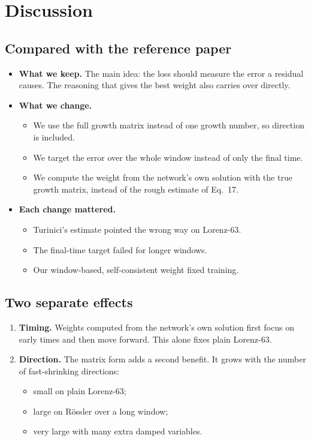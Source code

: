 \documentclass[11pt,a4paper]{article}
\begin{document}
\section{Discussion}

\subsection{Compared with the reference paper}
\begin{itemize}
\item \textbf{What we keep.} The main idea: the loss should measure the error a residual
  causes. The reasoning that gives the best weight also carries over directly.
\item \textbf{What we change.}
  \begin{itemize}
  \item We use the full growth matrix instead of one growth number, so direction is
    included.
  \item We target the error over the whole window instead of only the final time.
  \item We compute the weight from the network's own solution with the true growth
    matrix, instead of the rough estimate of Eq.~17.
  \end{itemize}
\item \textbf{Each change mattered.}
  \begin{itemize}
  \item Turinici's estimate pointed the wrong way on Lorenz-63.
  \item The final-time target failed for longer windows.
  \item Our window-based, self-consistent weight fixed training.
  \end{itemize}
\end{itemize}

\subsection{Two separate effects}
\begin{enumerate}
\item \textbf{Timing.} Weights computed from the network's own solution first focus on early
  times and then move forward. This alone fixes plain Lorenz-63.
\item \textbf{Direction.} The matrix form adds a second benefit. It grows with the number of
  fast-shrinking directions:
  \begin{itemize}
  \item small on plain Lorenz-63;
  \item large on Rössler over a long window;
  \item very large with many extra damped variables.
  \end{itemize}
\end{enumerate}
\end{document}
